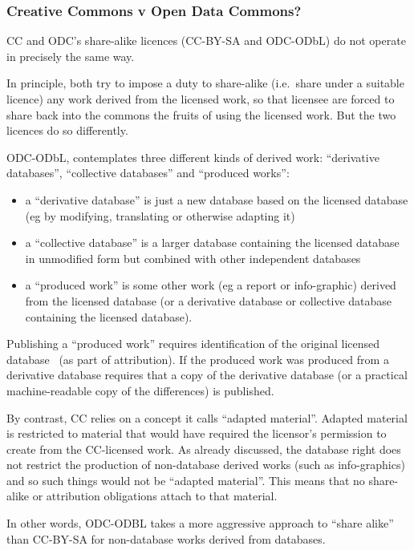 \subsubsection{Creative Commons v Open Data
Commons?}\label{creative-commons-v-open-data-commons}

CC and ODC's share-alike licences (CC-BY-SA and ODC-ODbL) do not operate
in precisely the same way.

In principle, both try to impose a duty to share-alike (i.e.~share under
a suitable licence) any work derived from the licensed work, so that
licensee are forced to share back into the commons the fruits of using
the licensed work. But the two licences do so differently.

ODC-ODbL, contemplates three different kinds of derived work:
``derivative databases'', ``collective databases'' and ``produced
works'':

\begin{itemize}
\item
  a ``derivative database'' is just a new database based on the licensed
  database (eg by modifying, translating or otherwise adapting it)
\item
  a ``collective database'' is a larger database containing the licensed
  database in unmodified form but combined with other independent
  databases
\item
  a ``produced work'' is some other work (eg a report or info-graphic)
  derived from the licensed database (or a derivative database or
  collective database containing the licensed database).
\end{itemize}

Publishing a ``produced work'' requires identification of the original
licensed database~ (as part of attribution). If the produced work was
produced from a derivative database requires that a copy of the
derivative database (or a practical machine-readable copy of the
differences) is published.

By contrast, CC relies on a concept it calls ``adapted material''.
Adapted material is restricted to material that would have required the
licensor's permission to create from the CC-licensed work. As already
discussed, the database right does not restrict the production of
non-database derived works (such as info-graphics) and so such things
would not be ``adapted material''. This means that no share-alike or
attribution obligations attach to that material.

In other words, ODC-ODBL takes a more aggressive approach to ``share
alike'' than CC-BY-SA for non-database works derived from databases.

